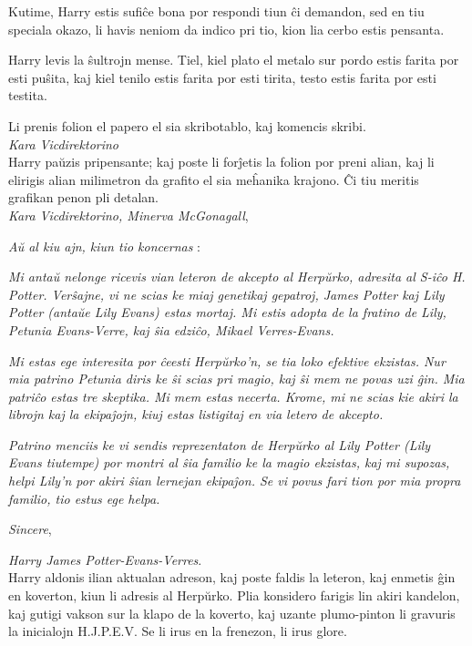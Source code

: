 Kutime, Harry estis sufiĉe bona por respondi tiun ĉi demandon, sed en
tiu speciala okazo, li havis neniom da indico pri tio, kion lia cerbo
estis pensanta.

Harry levis la ŝultrojn mense. Tiel, kiel plato el metalo sur pordo
estis farita por esti puŝita, kaj kiel tenilo estis farita por esti
tirita, testo estis farita por esti testita.

Li prenis folion el papero el sia skribotablo, kaj komencis skribi. \\

\emph{Kara Vicdirektorino} \\

Harry paŭzis pripensante; kaj poste li forĵetis la folion por preni
alian, kaj li elirigis alian milimetron da grafito el sia meĥanika
krajono. Ĉi tiu meritis grafikan penon pli detalan. \\

\emph{Kara Vicdirektorino, Minerva McGonagall},

\emph{Aŭ al kiu ajn, kiun tio koncernas} : 

\emph{Mi antaŭ nelonge ricevis vian leteron de akcepto al Herpŭrko,
adresita al S-iĉo H. Potter. Verŝajne, vi ne scias ke miaj genetikaj
gepatroj, James Potter kaj Lily Potter (antaŭe Lily Evans) estas
mortaj.  Mi estis adopta de la fratino de Lily, Petunia Evans-Verre,
kaj ŝia edziĉo, Mikael Verres-Evans.}

\emph{Mi estas ege interesita por ĉeesti Herpŭrko'n, se tia loko
efektive ekzistas. Nur mia patrino Petunia diris ke ŝi scias pri
magio, kaj ŝi mem ne povas uzi ĝin. Mia patriĉo estas tre skeptika. Mi
mem estas necerta. Krome, mi ne scias kie akiri la librojn kaj la
ekipaĵojn, kiuj estas listigitaj en via letero de akcepto.}

\emph{Patrino menciis ke vi sendis reprezentaton de Herpŭrko al Lily
Potter (Lily Evans tiutempe) por montri al ŝia familio ke la magio
ekzistas, kaj mi supozas, helpi Lily'n por akiri ŝian lernejan
ekipaĵon. Se vi povus fari tion por mia propra familio, tio estus ege
helpa.}

\emph{Sincere},

\emph{Harry James Potter-Evans-Verres}.\\


Harry aldonis ilian aktualan adreson, kaj poste faldis la leteron, kaj
enmetis ĝin en koverton, kiun li adresis al Herpŭrko. Plia konsidero
farigis lin akiri kandelon, kaj gutigi vakson sur la klapo de la
koverto, kaj uzante plumo-pinton li gravuris la inicialojn
H.J.P.E.V. Se li irus en la frenezon, li irus glore.


